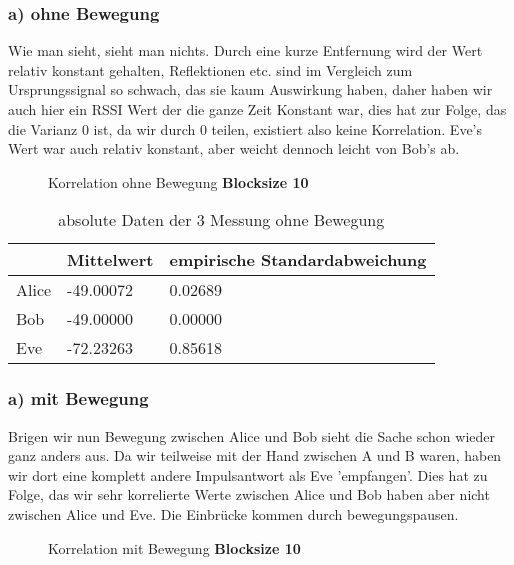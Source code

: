 \documentclass[12pt,a4paper]{article}
\begin{document}
\subsubsection*{a) ohne Bewegung}
Wie man sieht, sieht man nichts. Durch eine kurze Entfernung wird der Wert relativ konstant gehalten, Reflektionen etc. sind im Vergleich zum Ursprungssignal so schwach, das sie kaum Auswirkung haben, daher haben wir auch hier ein RSSI Wert der die ganze Zeit Konstant war, dies hat zur Folge, das die Varianz 0 ist, da wir durch 0 teilen, existiert also keine Korrelation. Eve's Wert war auch relativ konstant, aber weicht dennoch leicht von Bob's ab.
\begin{figure}[H]
\centering
{} \qquad
{}
\caption{Korrelation ohne Bewegung \textbf{Blocksize 10}}
\label{fig:3_a_o}
\end{figure}
\begin{table}[H]
\centering
\begin{tabular}{l|l|l}
& Mittelwert & empirische Standardabweichung \\
\hline
Alice & -49.00072 & 0.02689 \\
\hline
Bob & -49.00000 & 0.00000 \\
\hline
Eve & -72.23263 & 0.85618 \\
\hline
\end{tabular}
\caption{absolute Daten der 3 Messung ohne Bewegung}
\end{table}

\subsubsection*{a) mit Bewegung}
Brigen wir nun Bewegung zwischen Alice und Bob sieht die Sache schon wieder ganz anders aus. Da wir teilweise mit der Hand zwischen A und B waren, haben wir dort eine komplett andere Impulsantwort als Eve 'empfangen'. Dies hat zu Folge, das wir sehr korrelierte Werte zwischen Alice und Bob haben aber nicht zwischen Alice und Eve. Die Einbrücke kommen durch bewegungspausen.
\begin{figure}[H]
\centering
{} \qquad
{}
\caption{Korrelation mit Bewegung \textbf{Blocksize 10}}
\label{fig:3_a_m}
\end{figure}
\end{document}
